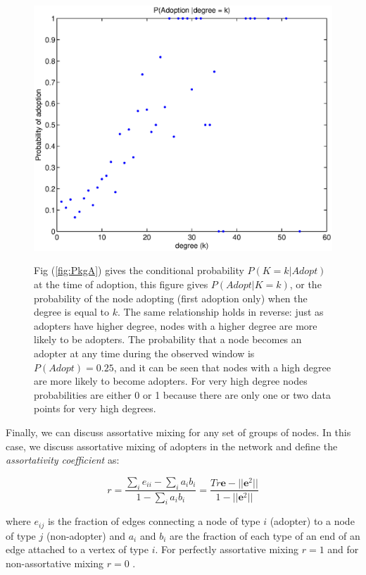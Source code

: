 \documentclass[12pt]{article}
\begin{document}
\begin{figure}[H]
\includegraphics[trim = 0cm 0cm 0cm 0cm, width = .9\textwidth]{Graficos/ProbAgk.eps}
\label{fig:ProbAgk}
\caption{Fig (\ref{fig:PkgA}) gives the conditional probability \(P(K = k | Adopt)\) at the time of adoption, this figure gives \(P(Adopt | K = k)\), or the probability of the node adopting (first adoption only) when the degree is equal to \(k\). The same relationship holds in reverse: just as adopters have higher degree, nodes with a higher degree are more likely to be adopters. The probability that a node becomes an adopter at any time during the observed window is \(P(Adopt) = 0.25\), and it can be seen that nodes with a high degree are more likely to become adopters. For very high degree nodes probabilities are either 0 or 1 because there are only one or two data points for very high degrees.}
\end{figure}

Finally, we can discuss assortative mixing for any set of groups of nodes. In this case, we discuss assortative mixing of adopters in the network and define the \emph{assortativity coefficient} as:

\begin{equation}
r = \frac{\sum_i e_{ii} - \sum_i a_i b_i}{1 - \sum_i a_i b_i} = \frac{Tr \mathbf{e} - || \mathbf{e}^2||}{1 - || \mathbf{e}^2||}
\end{equation}

where \(e_{ij}\) is the fraction of edges connecting a node of type \(i\) (adopter) to a node of type \(j\) (non-adopter) and \(a_i\) and \(b_i\) are the fraction of each type of an end of an edge attached to a vertex of type \(i\). For perfectly assortative mixing \(r = 1\) and for non-assortative mixing \(r = 0\) \cite{1}.
\end{document}
